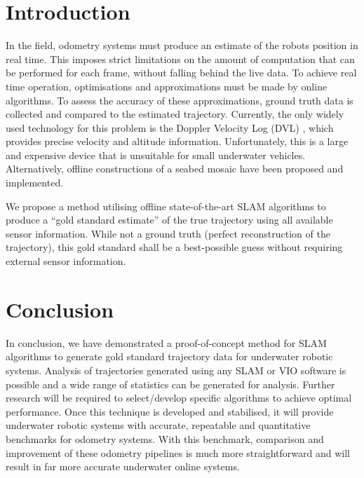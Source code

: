 \documentclass[12pt]{article}
\begin{document}
\tableofcontents
\newpage

\section{Introduction}\label{introduction}

In the field, odometry systems must produce an estimate of the robots position in real time. This imposes strict limitations on the amount of computation that can be performed for each frame, without falling behind the live data. To achieve real time operation, optimisations and approximations must be made by online algorithms. To assess the accuracy of these approximations, ground truth data is collected and compared to the estimated trajectory. Currently, the only widely used technology for this problem is the Doppler Velocity Log (DVL) \cite{wirth2013visual}, which provides precise velocity and altitude information. Unfortunately, this is a large and expensive device that is unsuitable for small underwater vehicles.  Alternatively, offline constructions of a seabed mosaic \cite{wirth2013visual} have been proposed and implemented.

We propose a method utilising offline state-of-the-art SLAM algorithms to produce a ``gold standard estimate'' of the true trajectory using all available sensor information. While not a ground truth (perfect reconstruction of the trajectory), this gold standard shall be a best-possible guess without requiring external sensor information.

\section{Conclusion}

In conclusion, we have demonstrated a proof-of-concept method for SLAM
algorithms to generate gold standard trajectory data for underwater robotic
systems. Analysis of trajectories generated using any SLAM or VIO software is
possible and a wide range of statistics can be generated for analysis. Further
research will be required to select/develop specific algorithms to achieve
optimal performance. Once this technique is developed and stabilised, it will provide underwater robotic systems with accurate, repeatable and quantitative benchmarks for odometry systems. With this benchmark, comparison and improvement of these odometry pipelines is much more straightforward and will result in far more accurate underwater online systems. 

\newpage
\fancyhead{}


\end{document}
